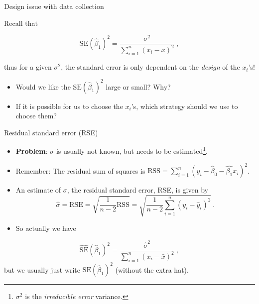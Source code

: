 \documentclass[
  10pt,
  ignorenonframetext,
]{beamer}
\begin{document}
\begin{frame}
\begin{block}{Design issue with data collection}
\protect\hypertarget{design-issue-with-data-collection}{}
\vspace{2mm}

Recall that

\[\text{SE}(\hat{\beta}_1)^2 = \frac{\sigma^2}{\sum_{i=1}^n (x_i-\bar{x})^2} \ ,\]

thus for a given \(\sigma^2\), the standard error is only dependent on
the \emph{design} of the \(x_i\)'s!

\vspace{2mm}

\begin{itemize}
\item
  Would we like the \(\text{SE}(\hat{\beta}_1)^2\) large or small? Why?
\item
  If it is possible for us to choose the \(x_i\)'s, which strategy
  should we use to choose them?
\end{itemize}

\vspace{4cm}
\end{block}
\end{frame}

\begin{frame}
\begin{block}{Residual standard error (RSE)}
\protect\hypertarget{residual-standard-error-rse}{}
\vspace{2mm}

\begin{itemize}
\item
  \textbf{Problem}: \(\sigma\) is usually not known, but needs to be
  estimated\footnote{$\sigma^2$ is the \emph{irreducible error} variance.}.
\item
  Remember: The residual sum of squares is
  \(\text{RSS}=\sum_{i=1}^n (y_i-\hat{\beta}_0-\hat{\beta_1}x_{i})^2\).
\item
  An estimate of \(\sigma\), the residual standard error, RSE, is given
  by
  \[\hat\sigma = \text{RSE}  =\sqrt{\frac{1}{n-2} \text{RSS}} = \sqrt{\frac{1}{n-2}\sum_{i=1}^n (y_i -\hat{y}_i)^2} \ .\]
\item
  So actually we have
\end{itemize}

\[\hat{\text{SE}}(\hat{\beta}_1)^2 = \frac{{\hat\sigma}^2}{\sum_{i=1}^n (x_i-\bar{x})^2} \ ,\]
but we usually just write \({\text{SE}}(\hat{\beta}_1)^2\) (without the
extra hat).
\end{block}
\end{frame}
\end{document}
